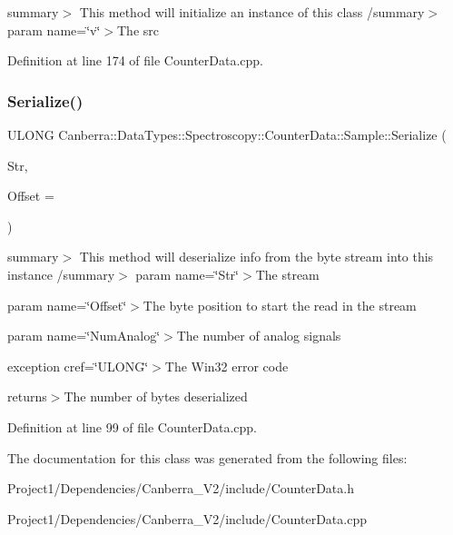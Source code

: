 summary$>$ This method will initialize an instance of this class /summary$>$ param name=\char`\"{}v\char`\"{}$>$The src

Definition at line 174 of file Counter\+Data.\+cpp.

\mbox{\label{class_canberra_1_1_data_types_1_1_spectroscopy_1_1_counter_data_1_1_sample_a74f6e5a66324cf9916a5e78ecfdb8f3e_a74f6e5a66324cf9916a5e78ecfdb8f3e}} 
\subsubsection{\texorpdfstring{Serialize()}{Serialize()}}
{\footnotesize\ttfamily U\+L\+O\+NG Canberra\+::\+Data\+Types\+::\+Spectroscopy\+::\+Counter\+Data\+::\+Sample\+::\+Serialize (\begin{DoxyParamCaption}\item[{\hyperlink{class_canberra_1_1_utility_1_1_core_1_1_byte_stream}{Canberra\+::\+Utility\+::\+Core\+::\+Byte\+Stream} \&}]{Str,  }\item[{const L\+O\+NG}]{Offset = {} }\end{DoxyParamCaption})}

summary$>$ This method will deserialize info from the byte stream into this instance /summary$>$ param name=\char`\"{}\+Str\char`\"{}$>$The stream

param name=\char`\"{}\+Offset\char`\"{}$>$The byte position to start the read in the stream

param name=\char`\"{}\+Num\+Analog\char`\"{}$>$The number of analog signals

exception cref=\char`\"{}\+U\+L\+O\+N\+G\char`\"{}$>$The Win32 error code

returns$>$The number of bytes deserialized

Definition at line 99 of file Counter\+Data.\+cpp.



The documentation for this class was generated from the following files\+:\begin{DoxyCompactItemize}
\item 
Project1/\+Dependencies/\+Canberra\+\_\+\+V2/include/Counter\+Data.\+h\item 
Project1/\+Dependencies/\+Canberra\+\_\+\+V2/include/Counter\+Data.\+cpp\end{DoxyCompactItemize}
